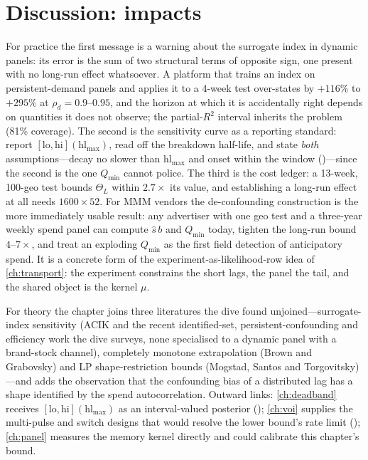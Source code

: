 \section{Discussion: impacts}

For practice the first message is a warning about the surrogate index in dynamic panels: its error is the sum of two structural terms of opposite sign, one present with no long-run effect whatsoever. A platform that trains an index on persistent-demand panels and applies it to a 4-week test over-states by $+116\%$ to $+295\%$ at $\rho_d = 0.9$--$0.95$, and the horizon at which it is accidentally right depends on quantities it does not observe; the partial-$R^2$ interval inherits the problem (81\% coverage). The second is the sensitivity curve as a reporting standard: report $[\mathrm{lo}, \mathrm{hi}](\mathrm{hl}_{\max})$, read off the breakdown half-life, and state \emph{both} assumptions---decay no slower than $\mathrm{hl}_{\max}$ and onset within the window ()---since the second is the one $Q_{\min}$ cannot police. The third is the cost ledger: a 13-week, 100-geo test bounds $\Theta_L$ within $2.7\times$ its value, and establishing a long-run effect at all needs $1600 \times 52$. For MMM vendors the de-confounding construction is the more immediately usable result: any advertiser with one geo test and a three-year weekly spend panel can compute $\hat s\,b$ and $Q_{\min}$ today, tighten the long-run bound $4$--$7\times$, and treat an exploding $Q_{\min}$ as the first field detection of anticipatory spend. It is a concrete form of the experiment-as-likelihood-row idea of \cref{ch:transport}: the experiment constrains the short lags, the panel the tail, and the shared object is the kernel $\mu$.

For theory the chapter joins three literatures the dive found unjoined---surrogate-index sensitivity (ACIK and the recent identified-set, persistent-confounding and efficiency work the dive surveys, none specialised to a dynamic panel with a brand-stock channel), completely monotone extrapolation (Brown and Grabovsky) and LP shape-restriction bounds (Mogstad, Santos and Torgovitsky)---and adds the observation that the confounding bias of a distributed lag has a shape identified by the spend autocorrelation. Outward links: \cref{ch:deadband} receives $[\mathrm{lo}, \mathrm{hi}](\mathrm{hl}_{\max})$ as an interval-valued posterior (); \cref{ch:voi} supplies the multi-pulse and switch designs that would resolve the lower bound's rate limit (); \cref{ch:panel} measures the memory kernel directly and could calibrate this chapter's bound.

